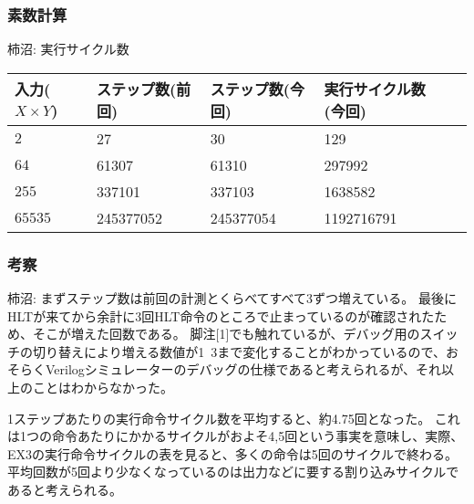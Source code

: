 \documentclass{jsarticle}
\begin{document}
\subsubsection*{素数計算}
柿沼:
実行サイクル数
\begin{table}[h]
  \begin{tabular}{|l|l|l|l|l|} \hline
    入力($X \times Y$) & ステップ数(前回) & ステップ数(今回) & 実行サイクル数(今回) \\ \hline
    $2$ & 27 & 30 & 129 \\ \hline
    $64$ & 61307 & 61310 & 297992 \\ \hline
    $255$ & 337101 & 337103\footnotemark[1] & 1638582\footnotemark[1] \\ \hline
    $65535$ & 245377052 & 245377054\footnotemark[1] & 1192716791\footnotemark[1] \\ \hline
  \end{tabular}
\end{table}

\subsubsection*{考察}
柿沼:
まずステップ数は前回の計測とくらべてすべて3ずつ増えている。
最後にHLTが来てから余計に3回HLT命令のところで止まっているのが確認されたため、そこが増えた回数である。
脚注[1]でも触れているが、デバッグ用のスイッチの切り替えにより増える数値が1~3まで変化することがわかっているので、おそらくVerilogシミュレーターのデバッグの仕様であると考えられるが、それ以上のことはわからなかった。

1ステップあたりの実行命令サイクル数を平均すると、約4.75回となった。
これは1つの命令あたりにかかるサイクルがおよそ4,5回という事実を意味し、実際、EX3の実行命令サイクルの表を見ると、多くの命令は5回のサイクルで終わる。平均回数が5回より少なくなっているのは出力などに要する割り込みサイクルであると考えられる。
\end{document}
